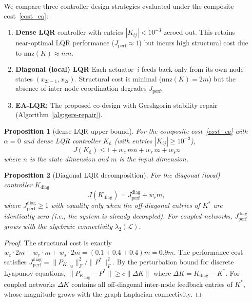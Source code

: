 \documentclass[conference]{IEEEtran}
\newtheorem{proposition}{Proposition}
\begin{document}
We compare three controller design strategies evaluated
under the composite cost~\eqref{cost_ea}:
\begin{enumerate}
  \item \textbf{Dense LQR} controller with entries
    $|K_{ij}|<10^{-3}$ zeroed out.  This retains near-optimal LQR
    performance ($J_{\mathrm{perf}}\approx 1$) but incurs high
    structural cost due to $\mathrm{nnz}(K)\approx mn$.
  \item \textbf{Diagonal (local) LQR} Each actuator~$i$ feeds back
    only from its own node states $(x_{2i-1},x_{2i})$.
    Structural cost is minimal ($\mathrm{nnz}(K)=2m$) but the
    absence of inter-node coordination degrades $J_{\mathrm{perf}}$.
  \item \textbf{EA-LQR:} The proposed co-design with Gershgorin
    stability repair (Algorithm~\ref{alg:gers-repair}).
\end{enumerate}

\begin{proposition}[dense LQR upper bound]\label{prop:d-ub}
For the composite cost~\eqref{cost_ea} with $\alpha=0$
and dense LQR controller $K_\mathrm{d}$ (with entries $|K_{ij}|\geq 10^{-3}$),
\begin{equation}\label{eq:d-ub}
  J(K_\mathrm{d}) \leq 1 + w_c\, mn + w_r\, m + w_sn
\end{equation}
where $n$ is the state dimension and $m$ is the input dimension.
\end{proposition}


\begin{proposition}[Diagonal LQR decomposition]\label{prop:diag-lb}
For the diagonal (local) controller $K_{\mathrm{diag}}$
\begin{equation}\label{eq:diag-cost}
  J(K_{\mathrm{diag}}) = J_{\mathrm{perf}}^{\mathrm{diag}}
  + w_rm,
\end{equation}
where $J_{\mathrm{perf}}^{\mathrm{diag}} \geq 1$ with equality
only when the off-diagonal entries of $K^*$ are identically zero
(i.e., the system is already decoupled).
For coupled networks, $J_{\mathrm{perf}}^{\mathrm{diag}}$
grows with the algebraic connectivity $\lambda_2(\mathcal{L})$.
\end{proposition}
\begin{proof}
The structural cost is exactly
$w_c \cdot 2m + w_r \cdot m + w_s \cdot 2m = (0.1 + 0.4 + 0.4)m = 0.9m$.
The performance cost satisfies
$J_{\mathrm{perf}}^{\mathrm{diag}} = \|P_{K_{\mathrm{diag}}}\|_F^2 / \|P^*\|_F^2$.
By the perturbation bound for discrete Lyapunov equations,
$\|P_{K_{\mathrm{diag}}} - P^*\| \geq c \|\Delta K\|$
where $\Delta K = K_{\mathrm{diag}} - K^*$.
For coupled networks $\Delta K$ contains all off-diagonal
inter-node feedback entries of $K^*$, whose magnitude
grows with the graph Laplacian connectivity.
\end{proof}
\end{document}
